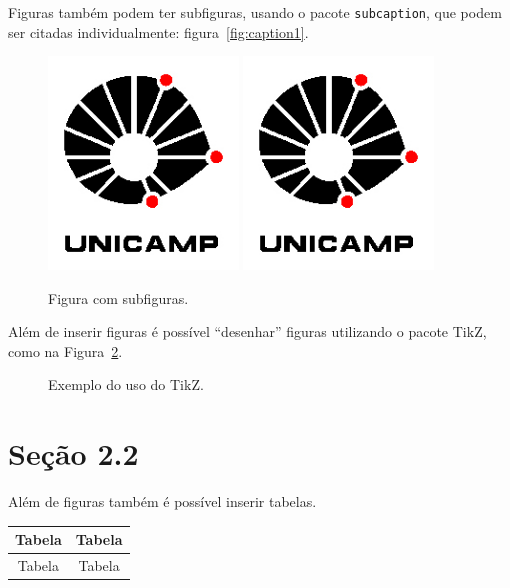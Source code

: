 Figuras tamb\'em podem ter subfiguras, usando o pacote \texttt{subcaption}, que 
podem ser citadas individualmente: figura~\ref{fig:caption1}.
\begin{figure}[!htb]
    \centering
        {\includegraphics[width=0.45\textwidth]{figuras/unicamp-logo.jpg}}
    \qquad
        {\includegraphics[width=0.45\textwidth]{figuras/unicamp-logo.jpg}}
    \caption{Figura com subfiguras.}
    \label{fig:subfig}
\end{figure}

Além de inserir figuras é possível ``desenhar'' figuras
utilizando o pacote TikZ, como na Figura~\ref{fig:exem_tikz}.
\begin{figure}[!htb]
\centering
{}
\caption{Exemplo do uso do TikZ.}
\label{fig:exem_tikz}
\end{figure}

\section{Se\c{c}\~ao 2.2}
Al\'em de figuras tamb\'em \'e poss\'ivel inserir tabelas. \\
\begin{tabular}{cc}
\toprule
Tabela & Tabela \\
\midrule
Tabela & Tabela \\
\bottomrule
\end{tabular}

